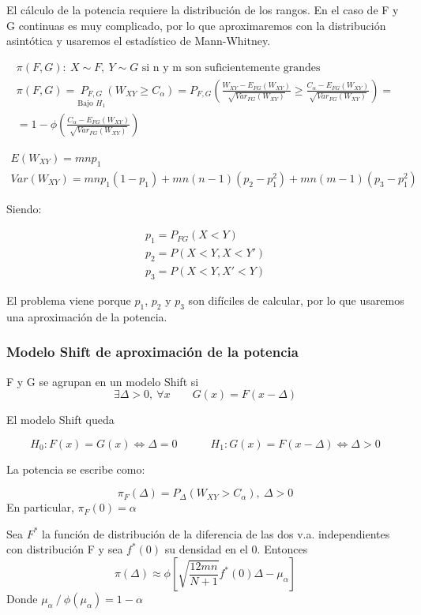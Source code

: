 El cálculo de la potencia requiere la distribución de los rangos. En el caso de F y G continuas es muy complicado, por lo que aproximaremos con la distribución asintótica y usaremos el estadístico de Mann-Whitney.

$$
\begin{array}{c}
    \pi(F,G):\ X\sim F,\ Y\sim G\text{ si n y m son suficientemente grandes} \\
    \pi(F,G)=\underset{\text{Bajo }H_1}{P_{F,G}}(W_{XY}\geq C_\alpha)=P_{F,G}\left(\frac{W_{XY}-E_{FG}(W_{XY})}{\sqrt{Var_{FG}(W_{XY})}}\geq \frac{C_\alpha-E_{FG}(W_{XY})}{\sqrt{Var_{FG}(W_{XY})}}\right)=\\
    =1-\phi\left(\frac{C_\alpha-E_{FG}(W_{XY})}{\sqrt{Var_{FG}(W_{XY})}}\right)
\end{array}
$$

$$
\begin{array}{c}
    E(W_{XY})=mnp_1\\
    Var(W_{XY})=mnp_1(1-p_1)+mn(n-1)(p_2-p_1^2)+mn(m-1)(p_3-p_1^2)
\end{array}
$$

Siendo:

$$
\begin{array}{c}
    p_1=P_{FG}(X<Y)\\
    p_2=P(X<Y,X<Y')\\
    p_3=P(X<Y,X'<Y)
\end{array}
$$

El problema viene porque $p_1$, $p_2$ y $p_3$ son difíciles de calcular, por lo que usaremos una aproximación de la potencia.

\subsubsection{Modelo Shift de aproximación de la potencia}

\begin{theorem}
    F y G se agrupan en un modelo Shift si
    $$
    \exists\Delta>0,\ \forall x\quad\quad G(x)=F(x-\Delta)
    $$
\end{theorem}

El modelo Shift queda

$$
H_0:F(x)=G(x)\iff\Delta=0\quad\quad\quad H_1:G(x)=F(x-\Delta)\iff\Delta>0
$$

La potencia se escribe como:

$$
\pi_F(\Delta)=P_\Delta(W_{XY}>C_\alpha),\ \Delta>0
$$
En particular, $\pi_F(0)=\alpha$

\begin{proposition}
    Sea $F^*$ la función de distribución de la diferencia de las dos v.a. independientes con distribución F y sea $f^*(0)$ su densidad en el 0. Entonces
    $$
    \pi(\Delta)\approx\phi\left[\sqrt{\frac{12mn}{N+1}}f^*(0)\Delta-\mu_\alpha\right]
    $$
    Donde $\mu_\alpha\ /\ \phi(\mu_\alpha)=1-\alpha$
\end{proposition}

